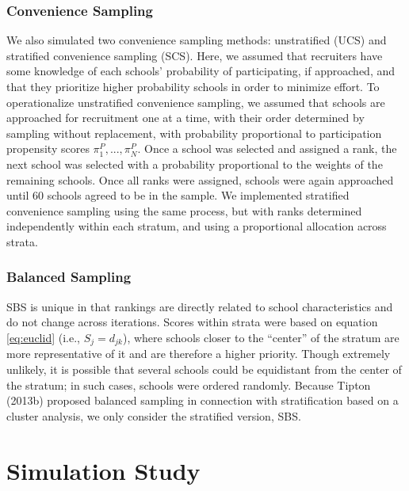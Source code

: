 \documentclass[man,floatsintext]{apa6}
\begin{document}
\hypertarget{convenience-sampling}{%
\subsubsection{Convenience Sampling}\label{convenience-sampling}}

We also simulated two convenience sampling methods: unstratified (UCS) and stratified convenience sampling (SCS). Here, we assumed that recruiters have some knowledge of each schools' probability of participating, if approached, and that they prioritize higher probability schools in order to minimize effort.
To operationalize unstratified convenience sampling, we assumed that schools are approached for recruitment one at a time, with their order determined by sampling without replacement, with probability proportional to participation propensity scores \(\pi^P_1,...,\pi^P_N\).
Once a school was selected and assigned a rank, the next school was selected with a probability proportional to the weights of the remaining schools. Once all ranks were assigned, schools were again approached until 60 schools agreed to be in the sample.
We implemented stratified convenience sampling using the same process, but with ranks determined independently within each stratum, and using a proportional allocation across strata.

\hypertarget{balanced-sampling-1}{%
\subsubsection{Balanced Sampling}\label{balanced-sampling-1}}

SBS is unique in that rankings are directly related to school characteristics and do not change across iterations. Scores within strata were based on equation \eqref{eq:euclid} (i.e., \(S_j = d_{jk}\)), where schools closer to the \enquote{center} of the stratum are more representative of it and are therefore a higher priority. Though extremely unlikely, it is possible that several schools could be equidistant from the center of the stratum; in such cases, schools were ordered randomly.
Because Tipton (2013b) proposed balanced sampling in connection with stratification based on a cluster analysis, we only consider the stratified version, SBS.

\hypertarget{simulation-study}{%
\section{Simulation Study}\label{simulation-study}}
\end{document}
